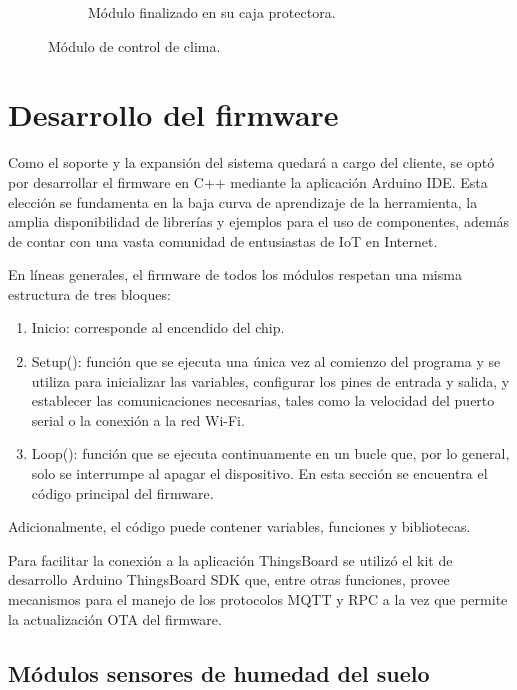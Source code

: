\begin{figure}[!htpb]
\begin{subfigure}[b]{0.45\textwidth}
		\caption{Módulo finalizado en su caja protectora.}
		\label{fig:vent3}
     \end{subfigure}
     \hfill
        \caption[Módulo de control de clima]{Módulo de control de clima.}
        \label{fig:ventcontrol}
\end{figure}


\pagebreak

\section{Desarrollo del firmware}
\label{sec:Desarrollo del firmware}

Como el soporte y la expansión del sistema quedará a cargo del cliente, se optó por desarrollar el firmware en C++ mediante la aplicación Arduino IDE. Esta elección se fundamenta en la baja curva de aprendizaje de la herramienta, la amplia disponibilidad de librerías y ejemplos para el uso de componentes, además de contar con una vasta comunidad de entusiastas de IoT en Internet.

En líneas generales, el firmware de todos los módulos respetan una misma estructura de tres bloques:

\begin{enumerate}
\item Inicio: corresponde al encendido del chip.
\item Setup(): función que se ejecuta una única vez al comienzo del programa y se utiliza para inicializar las variables, configurar los pines de entrada y salida, y establecer las comunicaciones necesarias, tales como la velocidad del puerto serial o la conexión a la red Wi-Fi.

\item Loop(): función que se ejecuta continuamente en un bucle que, por lo general, solo se interrumpe al apagar el dispositivo. En esta sección se encuentra el código principal del firmware.
\end{enumerate}
Adicionalmente, el código puede contener variables, funciones y bibliotecas.


Para facilitar la conexión a la aplicación ThingsBoard se utilizó el kit de desarrollo Arduino ThingsBoard SDK \citep{tbsdk} que, entre otras funciones, provee mecanismos para el manejo de los protocolos MQTT y RPC a la vez que permite la actualización OTA \citep{8999425} del firmware.




\subsection{Módulos sensores de humedad del suelo}
\label{Módulos sensores de humedad del suelo}



